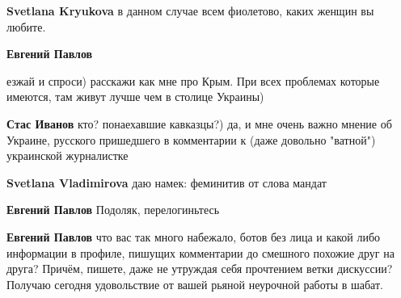 \begin{itemize}
\begin{itemize}
 
\textbf{Svetlana Kryukova} в данном случае всем фиолетово, каких женщин вы любите.

 
\textbf{Евгений Павлов} 

езжай и спроси) расскажи как мне про Крым. При всех проблемах которые имеются,
там живут лучше чем в столице Украины)

 
\textbf{Стас Иванов} кто? понаехавшие кавказцы?) да, и мне очень важно мнение об Украине, русского пришедшего в комментарии к (даже довольно "ватной") украинской журналистке

 

\textbf{Svetlana Vladimirova} даю намек: феминитив от слова мандат

 

\textbf{Евгений Павлов} Подоляк, перелогиньтесь

 
\textbf{Евгений Павлов} что вас так много набежало, ботов без лица и какой либо информации в профиле, пишущих комментарии до смешного похожие друг на друга? Причём, пишете, даже не утруждая себя прочтением ветки дискуссии? \Laughey[1.0][white] Получаю сегодня удовольствие от вашей рьяной неурочной работы в шабат.


\end{itemize}
\end{itemize}
